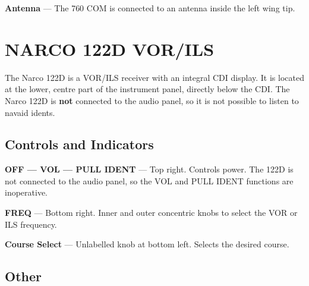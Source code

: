 \textbf{Antenna} --- The 760 COM is connected to an antenna inside the left wing tip.

\section{NARCO 122D VOR/ILS}


The Narco 122D is a VOR/ILS receiver with an integral CDI display. It is located at the lower, centre part of the instrument panel, directly below the CDI. The Narco 122D is \textbf{not} connected to the audio panel, so it is not possible to listen to navaid idents.

\subsection*{Controls and Indicators}

\textbf{OFF --- VOL --- PULL IDENT} --- Top right. Controls power. The 122D is not connected to the audio panel, so the VOL and PULL IDENT functions are inoperative.

\textbf{FREQ} --- Bottom right. Inner and outer concentric knobs to select the VOR or ILS frequency.

\textbf{Course Select} --- Unlabelled knob at bottom left. Selects the desired course.

\subsection*{Other}

